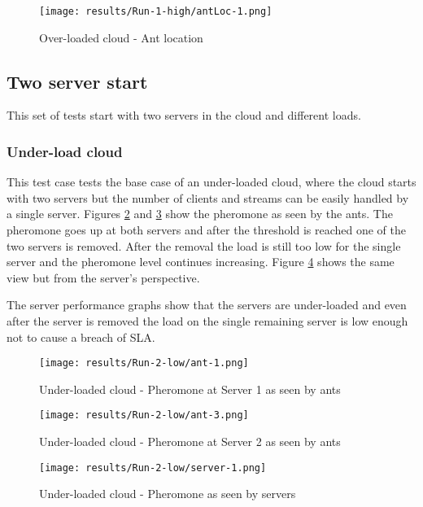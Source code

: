 \begin{figure}
	\centering
		\texttt{[image: results/Run-1-high/antLoc-1.png]}
	\caption{Over-loaded cloud - Ant location}
	\label{fig:1serv-antloc-high}
\end{figure}

\subsection{Two server start}

This set of tests start with two servers in the cloud and different loads.

\subsubsection{Under-load cloud}

This test case tests the base case of an under-loaded cloud, where the cloud starts with two servers but the number of clients and streams can be easily handled by a single server. Figures \ref{fig:2serv-ant1-low} and \ref{fig:2serv-ant3-low} show the pheromone as seen by the ants. The pheromone goes up at both servers and after the threshold is reached one of the two servers is removed. After the removal the load is still too low for the single server and the pheromone level continues increasing. Figure \ref{fig:2serv-pher-low} shows the same view but from the server's perspective.

The server performance graphs show that the servers are under-loaded and even after the server is removed the load on the single remaining server is low enough not to cause a breach of SLA.

\begin{figure}[!h]
	\centering
		\texttt{[image: results/Run-2-low/ant-1.png]}
	\caption{Under-loaded cloud - Pheromone at Server 1 as seen by ants}
	\label{fig:2serv-ant1-low}
\end{figure}

\begin{figure}
	\centering
		\texttt{[image: results/Run-2-low/ant-3.png]}
	\caption{Under-loaded cloud - Pheromone at Server 2 as seen by ants}
	\label{fig:2serv-ant3-low}
\end{figure}

\begin{figure}
	\centering
		\texttt{[image: results/Run-2-low/server-1.png]}
	\caption{Under-loaded cloud - Pheromone as seen by servers}
	\label{fig:2serv-pher-low}
\end{figure}

